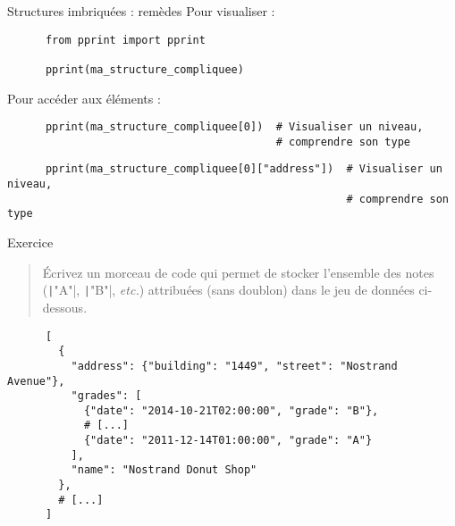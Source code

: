 \documentclass[10pt]{beamer}
\begin{document}
\begin{frame}[fragile]{Structures imbriquées : remèdes}
  Pour visualiser :

  \begin{beamercodeblock}
    \begin{verbatim}
      from pprint import pprint

      pprint(ma_structure_compliquee)
    \end{verbatim}
  \end{beamercodeblock}
 
  Pour accéder aux éléments :

  \begin{beamercodeblock}
    \begin{verbatim}
      pprint(ma_structure_compliquee[0])  # Visualiser un niveau, 
                                          # comprendre son type
    \end{verbatim}
  \end{beamercodeblock}

  \pause

  \begin{beamercodeblock}
    \begin{verbatim}
      pprint(ma_structure_compliquee[0]["address"])  # Visualiser un niveau, 
                                                     # comprendre son type
    \end{verbatim}
  \end{beamercodeblock}
 \end{frame}

 \begin{frame}[fragile]{Exercice}
  \begin{quote}
    Écrivez un morceau de code qui permet de stocker l'ensemble des notes (\texttt|"A"|, \texttt|"B"|, \emph{etc.}) attribuées (sans doublon) dans le jeu de données ci-dessous.
  \end{quote}

  \begin{beamercodeblock}
    \begin{verbatim}
      [
        {
          "address": {"building": "1449", "street": "Nostrand Avenue"},
          "grades": [
            {"date": "2014-10-21T02:00:00", "grade": "B"},
            # [...]
            {"date": "2011-12-14T01:00:00", "grade": "A"}
          ],
          "name": "Nostrand Donut Shop"
        },
        # [...]
      ]
    \end{verbatim}
  \end{beamercodeblock}
\end{frame}
\end{document}
